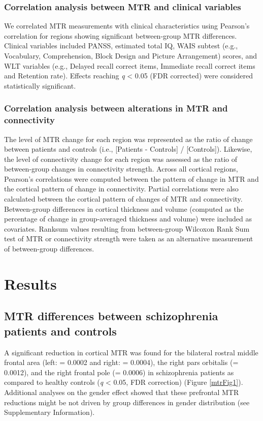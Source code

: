 \begin{refsection}
\subsubsection*{Correlation analysis between MTR and clinical variables}
We correlated MTR measurements with clinical characteristics using Pearson’s correlation for regions showing significant between-group MTR differences. Clinical variables included PANSS, estimated total IQ, WAIS subtest (e.g., Vocabulary, Comprehension, Block Design and Picture Arrangement) scores, and WLT variables (e.g., Delayed recall correct items, Immediate recall correct items and Retention rate). Effects reaching \textit{q} < 0.05 (FDR corrected) were considered statistically significant.

\subsubsection*{Correlation analysis between alterations in MTR and connectivity}
The level of MTR change for each region was represented as the ratio of change between patients and controls (i.e., {[}Patients - Controls{]} / {[}Controls{]}). Likewise, the level of connectivity change for each region was assessed as the ratio of between-group changes in connectivity strength. Across all cortical regions, Pearson’s correlations were computed between the pattern of change in MTR and the cortical pattern of change in connectivity. Partial correlations were also calculated between the cortical pattern of changes of MTR and connectivity. Between-group differences in cortical thickness and volume (computed as the percentage of change in group-averaged thickness and volume) were included as covariates. Ranksum values resulting from between-group Wilcoxon Rank Sum test of MTR or connectivity strength were taken as an alternative measurement of between-group differences.


\section*{Results}
\subsection*{MTR differences between schizophrenia patients and controls}
A significant reduction in cortical MTR was found for the bilateral rostral middle frontal area (left: \pval = 0.0002 and right: \pval = 0.0004), the right pars orbitalis (\pval = 0.0012), and the right frontal pole (\pval = 0.0006) in schizophrenia patients as compared to healthy controls (\textit{q} < 0.05, FDR correction) (Figure \ref{mtrFig1}). Additional analyses on the gender effect showed that these prefrontal MTR reductions might be not driven by group differences in gender distribution (see Supplementary Information).


\end{refsection}
